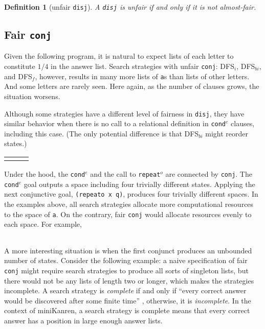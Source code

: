 \documentclass[format=acmlarge, review=false, authordraft=false]{acmart}
\newcommand{\conde}{\texttt{cond$^e$}}
\newcommand{\conj}{\texttt{conj}}
\newcommand{\disj}{\texttt{disj}}
\newcommand{\repeato}{\texttt{repeat$^o$}}
\newcommand{\DFSi }[0]{DFS$_{i}$}
\newcommand{\DFSf }[0]{DFS$_{f}$}
\newcommand{\DFSbi}[0]{DFS$_{bi}$}
\newtheorem{defn}{Definition}[section]
\begin{document}
\begin{defn}[unfair \disj{}]
A \disj{} is unfair if and only if it is not almost-fair.
\end{defn}

\subsection{Fair \texttt{conj}}
\label{sec:fairconj}

Given the following program, it is natural to expect lists of each letter to
constitute $1/4$ in the answer list. Search strategies with unfair \conj{}:
\DFSi, \DFSbi, and \DFSf, however, results in many more lists of \texttt{a}s 
than 
lists of other letters. And some letters are rarely seen. Here again, as the
number of clauses grows, the situation worsens. 

Although some strategies have a different level of fairness in \disj{}, they 
have similar behavior when there is no call to a relational definition 
in \conde{} clauses, including this case. (The only potential difference is 
that \DFSbi{} might reorder states.)

\begin{center}
\begin{tabular}{l|c|r}
     &
     &
     \\
\end{tabular}
\end{center}

Under the hood, the \conde{} and the call to \repeato{} are connected by 
\conj{}. The \conde{} goal outputs a space including four trivially 
different states. 
Applying the next conjunctive goal, \texttt{(repeato x q)}, produces four 
trivially different spaces.
In the examples above, all search strategies allocate more computational 
resources to the space of \texttt{a}. On the contrary, fair \conj{} 
would allocate resources evenly to each space. For example,

\begin{center}
	\begin{tabular}{c}
		
	\end{tabular}
\end{center}

A more interesting situation is when the first conjunct produces an unbounded
number of states. Consider the following example: a naive specification of 
fair \conj{} 
might require search strategies to produce all sorts of singleton lists, but 
there
would not be any lists of length two or longer, which makes the strategies 
incomplete. 
A search strategy is \emph{complete} if and only if ``every correct answer 
would be discovered after some finite time'' \cite{seres1999algebra}, 
otherwise, it is \emph{incomplete}. In the 
context of miniKanren, a search strategy is complete means that every correct 
answer has a position in large enough answer lists.
\end{document}
